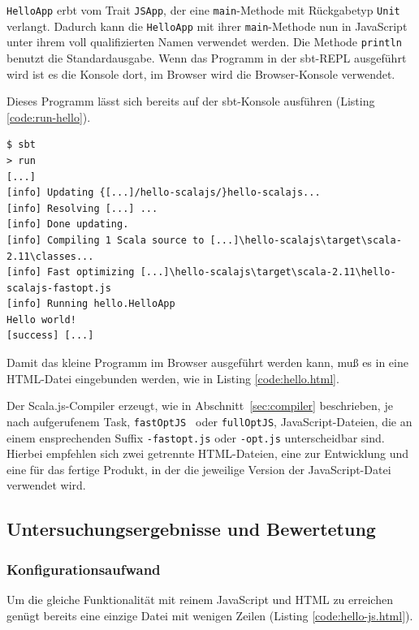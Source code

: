 \documentclass[a4paper, 12pt, listof=totoc, bibliography=totoc]{scrreprt}
\begin{document}
\texttt{HelloApp} erbt vom Trait \texttt{JSApp}, der eine \texttt{main}-Methode mit Rückgabetyp \texttt{Unit} verlangt. Dadurch kann die \texttt{HelloApp} mit ihrer \texttt{main}-Methode nun in JavaScript unter ihrem voll qualifizierten Namen verwendet werden. Die Methode \texttt{println} benutzt die Standardausgabe. Wenn das Programm in der sbt-REPL ausgeführt wird ist es die Konsole dort, im Browser wird die Browser-Konsole verwendet.

Dieses Programm lässt sich bereits auf der sbt-Konsole ausführen (Listing \ref{code:run-hello}).

\begin{lstlisting}[caption={Lauf des Hallo-Welt-Programms in der sbt-REPL.}, label={code:run-hello}]
$ sbt
> run
[...]
[info] Updating {[...]/hello-scalajs/}hello-scalajs...
[info] Resolving [...] ...
[info] Done updating.
[info] Compiling 1 Scala source to [...]\hello-scalajs\target\scala-2.11\classes...
[info] Fast optimizing [...]\hello-scalajs\target\scala-2.11\hello-scalajs-fastopt.js
[info] Running hello.HelloApp
Hello world!
[success] [...]
\end{lstlisting}

Damit das kleine Programm im Browser ausgeführt werden kann, muß es in eine HTML-Datei eingebunden werden, wie in Listing \ref{code:hello.html}.



Der Scala.js-Compiler erzeugt, wie in Abschnitt~\ref{sec:compiler} beschrieben, je nach aufgerufenem Task, \texttt{fastOptJS } oder \texttt{fullOptJS}, JavaScript-Dateien, die an einem ensprechenden Suffix \texttt{-fastopt.js} oder \texttt{-opt.js} unterscheidbar sind. Hierbei empfehlen sich zwei getrennte HTML-Dateien, eine zur Entwicklung und eine für das fertige Produkt, in der die jeweilige Version der JavaScript-Datei verwendet wird.

\subsection{Untersuchungsergebnisse und Bewertetung}

\subsubsection{Konfigurationsaufwand}

Um die gleiche Funktionalität mit reinem JavaScript und HTML zu erreichen genügt bereits eine einzige Datei mit wenigen Zeilen (Listing \ref{code:hello-js.html}).
\end{document}
